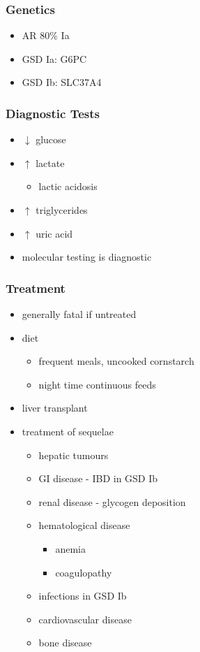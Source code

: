 \documentclass{scrartcl}
\begin{document}
\subsubsection{Genetics}
\label{sec:org967614d}
\begin{itemize}
\item AR 80\% Ia
\item GSD Ia: G6PC
\item GSD Ib: SLC37A4
\end{itemize}

\subsubsection{Diagnostic Tests}
\label{sec:org8982eb0}
\begin{itemize}
\item \(\downarrow\) glucose
\item \(\uparrow\) lactate
\begin{itemize}
\item lactic acidosis
\end{itemize}
\item \(\uparrow\) triglycerides
\item \(\uparrow\) uric acid
\item molecular testing is diagnostic
\end{itemize}

\subsubsection{Treatment}
\label{sec:org1a87941}
\begin{itemize}
\item generally fatal if untreated
\item diet
\begin{itemize}
\item frequent meals, uncooked cornstarch
\item night time continuous feeds
\end{itemize}
\item liver transplant
\item treatment of sequelae
\begin{itemize}
\item hepatic tumours
\item GI disease - IBD in GSD Ib
\item renal disease - glycogen deposition
\item hematological disease
\begin{itemize}
\item anemia
\item coagulopathy
\end{itemize}
\item infections in GSD Ib
\item cardiovascular disease
\item bone disease
\end{itemize}
\end{itemize}
\end{document}
